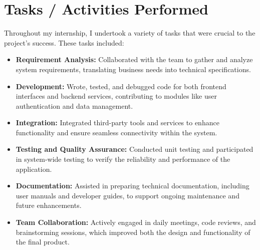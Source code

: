\section{Tasks / Activities Performed}
Throughout my internship, I undertook a variety of tasks that were crucial to the project's success. These tasks included:
\begin{itemize}
    \item \textbf{Requirement Analysis:} Collaborated with the team to gather and analyze system requirements, translating business needs into technical specifications.
    \item \textbf{Development:} Wrote, tested, and debugged code for both frontend interfaces and backend services, contributing to modules like user authentication and data management.
    \item \textbf{Integration:} Integrated third-party tools and services to enhance functionality and ensure seamless connectivity within the system.
    \item \textbf{Testing and Quality Assurance:} Conducted unit testing and participated in system-wide testing to verify the reliability and performance of the application.
    \item \textbf{Documentation:} Assisted in preparing technical documentation, including user manuals and developer guides, to support ongoing maintenance and future enhancements.
    \item \textbf{Team Collaboration:} Actively engaged in daily meetings, code reviews, and brainstorming sessions, which improved both the design and functionality of the final product.
\end{itemize}
